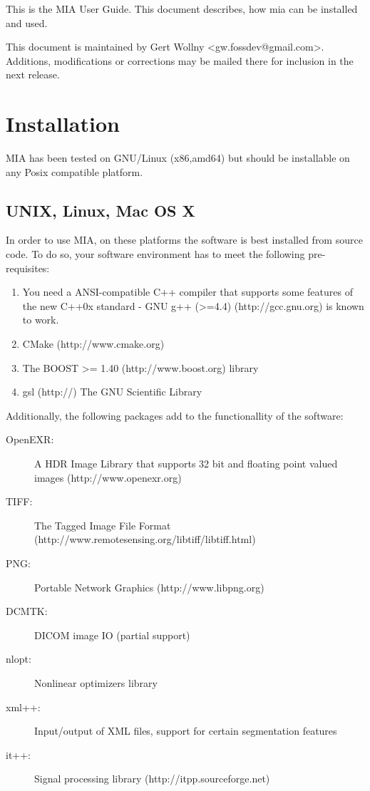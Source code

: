 \documentclass[english, 10pt, a4paper,headsepline,openany]{scrbook}
\begin{document}
This is the MIA User Guide. This document describes, how mia can be installed and used. 

This document is maintained by Gert Wollny <gw.fossdev@gmail.com>. 
Additions, modifications or corrections may be mailed there for inclusion in the next release. 

\section{Installation}

MIA has been tested on GNU/Linux (x86,amd64) but should be installable on any Posix compatible platform. 


\subsection{UNIX, Linux, Mac OS X} 

In order to use MIA, on these platforms the software is best installed from source code. 
To do so, your software environment has to meet the following pre-requisites: 

\begin{enumerate}
\item You need a ANSI-compatible C++ compiler that supports some features of the new C++0x standard 
   - GNU g++ (>=4.4) (http://gcc.gnu.org) is known to work. 
\item CMake (http://www.cmake.org) 
\item The BOOST >= 1.40 (http://www.boost.org) library
\item gsl (http://) The GNU Scientific Library 
\end{enumerate}

Additionally, the following packages add to the functionallity of the software: 

\begin{description}
\item [OpenEXR:] A HDR Image Library that supports 32 bit and floating point valued images (http://www.openexr.org)
\item [TIFF:]    The Tagged Image File Format (http://www.remotesensing.org/libtiff/libtiff.html)
\item [PNG:]     Portable Network Graphics (http://www.libpng.org)
\item [DCMTK:]   DICOM image IO (partial support) 
\item [nlopt:]   Nonlinear optimizers library 
\item [xml++:]   Input/output of XML files, support for certain segmentation features
\item [it++:]    Signal processing library (http://itpp.sourceforge.net) 
\end{description}
\end{document}
